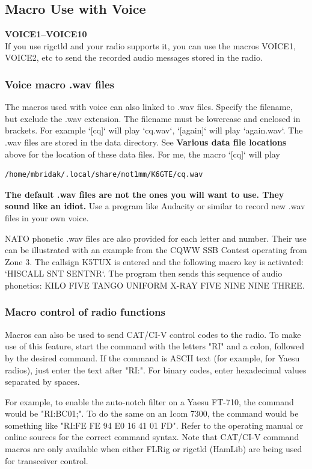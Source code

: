 \documentclass{article}
\begin{document}
\subsection{Macro Use with Voice}
\textbf{{VOICE1}--{VOICE10}}\\
If you use rigctld and your radio supports it, you can use the macros {VOICE1}, {VOICE2}, etc to send the recorded audio messages stored in the radio.
\subsubsection{Voice macro .wav files}
The macros used with voice can also linked to .wav files. Specify the filename, but exclude the .wav extension. The filename must be lowercase and enclosed in brackets. For example `[cq]` will play `cq.wav`, `[again]` will play `again.wav`. The .wav files are stored in the data directory.  See \textbf{Various data file locations} above for the location of these data files. For me, the macro `[cq]` will play 
\begin{verbatim}/home/mbridak/.local/share/not1mm/K6GTE/cq.wav
\end{verbatim}

\textbf{The default .wav files are not the ones you will want to use. They sound like an idiot.} Use a program like Audacity or similar to record new .wav files in your own voice.

NATO phonetic .wav files are also provided for each letter and number. Their use can be illustrated with an example from the CQWW SSB Contest operating from Zone 3. The callsign K5TUX is entered and the following macro key is activated: `{HISCALL} {SNT} {SENTNR}`. The program then sends this sequence of audio phonetics: KILO FIVE TANGO UNIFORM X-RAY FIVE NINE NINE THREE. 

\subsubsection{Macro control of radio functions}
Macros can also be used to send CAT/CI-V control codes to the radio. To make use of this feature, start the command with the letters "RI" and a colon, followed by the desired command. If the command is ASCII text (for example, for Yaesu radios), just enter the text after "RI:". For binary codes, enter hexadecimal values separated by spaces.

For example, to enable the auto-notch filter on a Yaesu FT-710, the command would be "RI:BC01;". To do the same on an Icom 7300, the command would be something like "RI:FE FE 94 E0 16 41 01 FD". Refer to the operating manual or online sources for the correct command syntax.
Note that CAT/CI-V command macros are only available when either FLRig or rigctld (HamLib) are being used for transceiver control.
\end{document}
